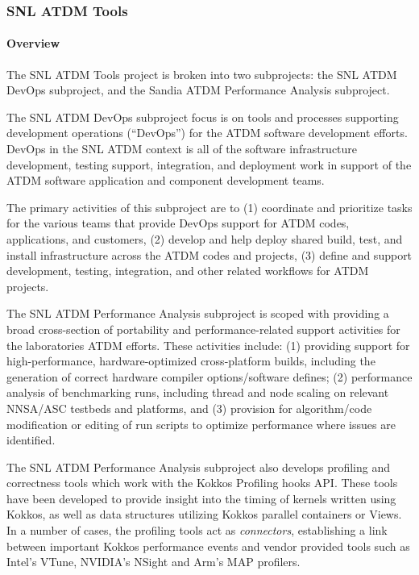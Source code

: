 \subsubsection{ SNL ATDM Tools} 

\paragraph{Overview}

The SNL ATDM Tools project is broken into two subprojects: the SNL ATDM DevOps subproject, and the Sandia ATDM Performance Analysis subproject.

The SNL ATDM DevOps subproject focus is on tools and processes supporting development operations (``DevOps'') for the ATDM software development efforts.
DevOps in the SNL ATDM context is all of the software infrastructure development, testing support, integration, and deployment work in support of the ATDM software application and component development teams.

The primary activities of this subproject are to (1) coordinate and prioritize tasks for the various teams that provide DevOps support for ATDM codes, applications, and customers, (2) develop and help deploy shared build, test, and install infrastructure across the ATDM codes and projects, (3) define and support development, testing, integration, and other related workflows for ATDM projects.

The SNL ATDM Performance Analysis subproject is scoped with providing a broad cross-section of portability and performance-related support activities for the laboratories ATDM efforts.
These activities include: (1) providing support for high-performance, hardware-optimized cross-platform builds, including the generation of correct hardware compiler options/software defines; (2) performance
analysis of benchmarking runs, including thread and node scaling on relevant NNSA/ASC testbeds and platforms, and (3) provision for algorithm/code modification or editing of run scripts to optimize performance where issues are identified.

The SNL ATDM Performance Analysis subproject also develops profiling and correctness tools which work with the Kokkos Profiling hooks API.
These tools have been developed to provide insight into the timing of kernels written using Kokkos, as well as data structures utilizing Kokkos parallel containers or Views.
In a number of cases, the profiling tools act as {\em connectors}, establishing a link between important Kokkos performance events and vendor provided tools such as Intel's VTune, NVIDIA's NSight and Arm's MAP profilers.

